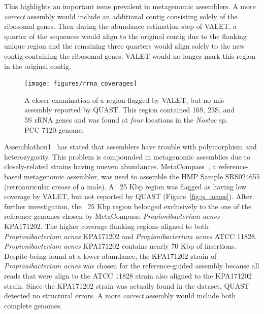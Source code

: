 \documentclass[12pt,\mydriver]{thesis}
\begin{document}
This highlights an important issue prevalent in metagenomic assemblers.
A more \emph{correct} assembly would include an additional contig consisting solely of the ribosomal genes.
Then during the abundance estimation step of VALET, a quarter of the sequences would align to the original contig due to the flanking unique region and the remaining three quarters would align solely to the new contig containing the ribosomal genes.
VALET would no longer mark this region in the original contig.

\begin{figure}[tb!]
\begin{center}
\texttt{[image: figures/rrna\_coverages]}
\end{center}
\renewcommand{\baselinestretch}{1}
\small\normalsize
\begin{quote}
\caption[Ribosomal genes found in region marked by VALET]{A closer examination of a region flagged by VALET, but no mis-assembly reported by QUAST. This region contained 16S, 23S, and 5S rRNA genes and was found at \emph{four} locations in the \emph{Nostoc} sp. PCC 7120 genome.}
\label{fig:rrna_misassembly}
\end{quote}
\end{figure}
\renewcommand{\baselinestretch}{2}
\small\normalsize

Assemblathon1~\cite{earl2011assemblathon} has stated that assemblers have trouble with polymorphism and heterozygosity.
This problem is compounded in metagenomic assemblies due to closely-related strains having uneven abundances.
MetaCompass~\cite{metacompass}, a reference-based metagenomic assembler, was used to assemble the HMP Sample SRS024655 (retroauricular crease of a male).
A ~25 Kbp region was flagged as having low coverage by VALET, but not reported by QUAST (Figure~\ref{fig:p_acnes}).
After further investigation, the ~25 Kbp region belonged exclusively to the one of the reference genomes chosen by MetaCompass: \emph{Propionibacterium acnes} KPA171202.
The higher coverage flanking regions aligned to both \emph{Propionibacterium acnes} KPA171202 and \emph{Propionibacterium acnes} ATCC 11828.
\emph{Propionibacterium acnes} KPA171202 contains nearly 70 Kbp of insertions.
Despite being found at a lower abundance, the KPA171202 strain of \emph{Propionibacterium acnes} was chosen for the reference-guided assembly because all reads that were align to the ATCC 11828 strain also aligned to the KPA171202 strain.
Since the KPA171202 strain was actually found in the dataset, QUAST detected no structural errors.
A more \emph{correct} assembly would include both complete genomes.
\end{document}

